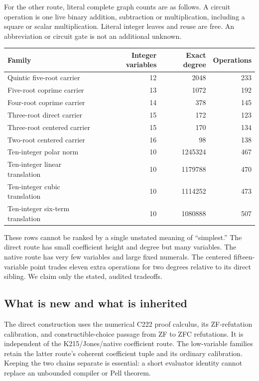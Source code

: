 \documentclass[11pt]{article}
\begin{document}
For the other route, literal complete graph counts are as follows.
A circuit operation is one live binary addition, subtraction or
multiplication, including a square or scalar multiplication. Literal
integer leaves and reuse are free. An abbreviation or circuit gate is
not an additional unknown.
\begin{center}
\begin{tabular}{lrrr}
\toprule
Family & Integer variables & Exact degree & Operations\\
\midrule
Quintic five-root carrier &12&2048&233\\
Five-root coprime carrier &13&1072&192\\
Four-root coprime carrier &14&378&145\\
Three-root direct carrier &15&172&123\\
Three-root centered carrier &15&170&134\\
Two-root centered carrier &16&98&138\\
Ten-integer polar norm &10&1245324&467\\
Ten-integer linear translation &10&1179788&470\\
Ten-integer cubic translation &10&1114252&473\\
Ten-integer six-term translation &10&1080888&507\\
\bottomrule
\end{tabular}
\end{center}
These rows cannot be ranked by a single unstated meaning of ``simplest.''
The direct route has small coefficient height and degree but many
variables. The native route has very few variables and large fixed
numerals. The centered fifteen-variable point trades eleven extra
operations for two degrees relative to its direct sibling. We claim
only the stated, audited tradeoffs.

\subsection{What is new and what is inherited}
The direct construction uses the numerical C222 proof calculus, its
ZF-refutation calibration, and constructible-choice passage from ZF to
ZFC refutations. It is independent of the K215/Jones/native coefficient
route. The low-variable families retain the latter route's coherent
coefficient tuple and its ordinary calibration. Keeping the two chains
separate is essential: a short evaluator identity cannot replace an
unbounded compiler or Pell theorem.
\end{document}
